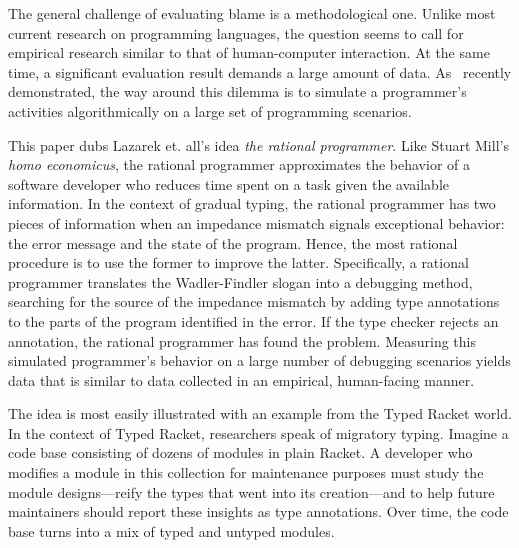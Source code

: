 
The general challenge of evaluating blame is a methodological one. Unlike most
current research on programming languages, the question seems to call for
empirical research similar to that of human-computer interaction. At the same
time, a significant evaluation result demands a large amount of
data. As~\citet{lksfd-popl-2020} recently demonstrated, the way around this
dilemma is to simulate a programmer's activities algorithmically on a large set
of programming scenarios.



This paper dubs Lazarek et. all's idea {\em the rational programmer\/}. Like Stuart
Mill's {\it homo economicus\/}, the rational programmer approximates the
behavior of a software developer who reduces time spent on a task given the
available information. In the context of gradual typing, the rational programmer
has two pieces of information when an impedance mismatch signals exceptional
behavior: the error message and the state of the program. Hence, the most
rational procedure is to use the former to improve the latter. Specifically,
a rational programmer translates the Wadler-Findler slogan into a debugging
method, searching for the source of the impedance mismatch by adding type
annotations to the parts of the program identified in the error.
If the type checker rejects an annotation, the rational programmer has found the problem.
Measuring this simulated programmer's behavior on a large number of
debugging scenarios yields data that is similar to data collected in an
empirical, human-facing manner.

The idea is most easily illustrated with an example from the Typed Racket
world. In the context of Typed Racket, researchers speak of migratory
typing. Imagine a code base consisting of dozens of modules in plain Racket.  A
developer who modifies a module in this collection for maintenance purposes must
study the module designs---reify the types that went into its creation---and to
help future maintainers should report these insights as type annotations. Over
time, the code base turns into a mix of typed and untyped modules.


